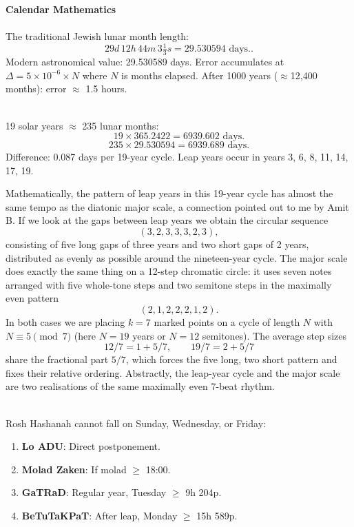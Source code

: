 \begin{technical}
{\Large\textbf{Calendar Mathematics}}\\[0.2em]

\\[0.3em]
The traditional Jewish lunar month length:
\[
29d\,12h\,44m\,3\tfrac{1}{3}s = 29.530594\text{ days.}.
\]
Modern astronomical value: 29.530589 days. Error accumulates at $\Delta = 5 \times 10^{-6} \times N$  where $N$ is months elapsed. After 1000 years ($\approx$12,400 months): error $\approx$ 1.5 hours.

\\[0.3em]
19 solar years $\approx$ 235 lunar months:
\[
19 \times 365.2422 = 6939.602\text{ days}.
\]
\[
235 \times 29.530594 = 6939.689\text{ days}.
\]
Difference: 0.087 days per 19-year cycle. Leap years occur in years 3, 6, 8, 11, 14, 17, 19.

Mathematically, the pattern of leap years in this 19-year cycle has almost the same \QSOpen{}tempo\QSClose{} as the diatonic major scale, a connection pointed out to me by Amit B. If we look at the gaps between leap years we obtain the circular sequence
\[
(3,2,3,3,3,2,3),
\]
consisting of five \QSOpen{}long\QSClose{} gaps of three years and two \QSOpen{}short\QSClose{} gaps of 2 years, distributed as evenly as possible around the nineteen-year cycle.  The major scale does exactly the same thing on a 12-step chromatic circle: it uses seven notes arranged with five whole-tone steps and two semitone steps in the maximally even pattern
\[
(2,1,2,2,2,1,2).
\]
In both cases we are placing \(k=7\) marked points on a cycle of length \(N\) with \(N \equiv 5 \pmod 7\) (here \(N=19\) years or \(N=12\) semitones).  The average step sizes
\[
12/7 = 1 + 5/7, \qquad 19/7 = 2 + 5/7
\]
share the fractional part $5/7$, which forces the \QSOpen{}five long, two short\QSClose{} pattern and fixes their relative ordering.  Abstractly, the leap-year cycle and the major scale are two realisations of the same maximally even 7-beat rhythm.

\\[0.2em]
Rosh Hashanah cannot fall on Sunday, Wednesday, or Friday:
\begin{enumerate}[leftmargin=*,topsep=0pt,itemsep=0pt]
\item \textbf{Lo ADU}: Direct postponement.
\item \textbf{Molad Zaken}: If molad $\geq$ 18:00.
\item \textbf{GaTRaD}: Regular year, Tuesday $\geq$ 9h 204p.
\item \textbf{BeTuTaKPaT}: After leap, Monday $\geq$ 15h 589p.
\end{enumerate}


\end{technical}
